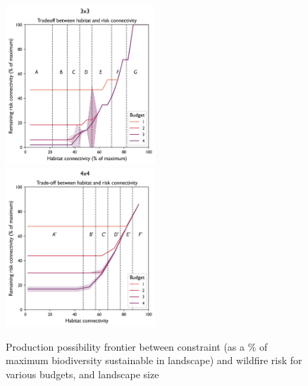 \begin{figure}[h]
    \centering
    \includegraphics[width=0.5\textwidth]{figures/wildland/tradeoff3.png}\hfill
    \includegraphics[width=0.5\textwidth]{figures/wildland/tradeoff4.png}
    \\[\smallskipamount]
    \caption{Production possibility frontier between constraint (as a \% of maximum biodiversity sustainable in landscape) and wildfire risk for various budgets, and landscape size}
    \label{fig:frontier}
\end{figure}
\newpage

